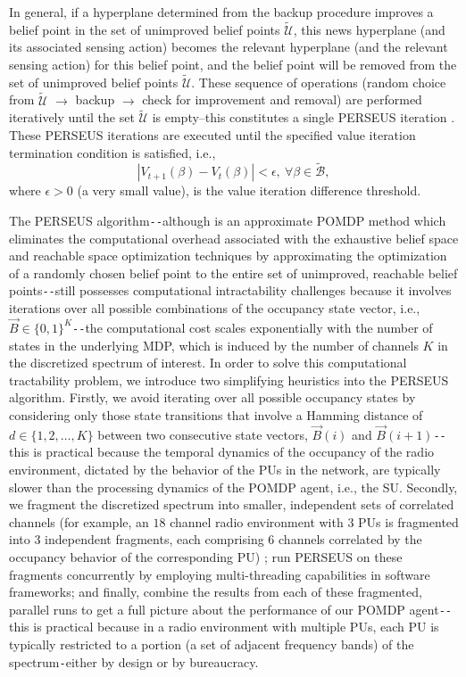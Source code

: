 \documentclass[12pt, draftcls, onecolumn]{IEEEtran}
\begin{document}
In general, if a hyperplane determined from the backup procedure improves a belief point in the set of unimproved belief points $\tilde{\mathcal{U}}$, this news hyperplane (and its associated sensing action) becomes the relevant hyperplane (and the relevant sensing action) for this belief point, and the belief point will be removed from the set of unimproved belief points $\tilde{\mathcal{U}}$. These sequence of operations (random choice from $\tilde{\mathcal{U}}$ ${\longrightarrow}$ backup ${\longrightarrow}$ check for improvement and removal) are performed iteratively until the set $\tilde{\mathcal{U}}$ is empty--this constitutes a single PERSEUS iteration \cite{WCL:paper}. These PERSEUS iterations are executed until the specified value iteration termination condition is satisfied, i.e.,
\begin{equation}\label{29}
    |V_{t+1}(\beta)-V_{t}(\beta)|<\epsilon,\ \forall \beta \in \tilde{\mathcal{B}},
\end{equation}
where $\epsilon{>}0$ (a very small value), is the value iteration difference threshold.

The PERSEUS algorithm\texttt{-{}-}although is an approximate POMDP method which eliminates the computational overhead associated with the exhaustive belief space and reachable space optimization techniques \cite{PUOccupancy:18,PUOccupancy:17} by approximating the optimization of a randomly chosen belief point to the entire set of unimproved, reachable belief points\texttt{-{}-}still possesses computational intractability challenges because it involves iterations over all possible combinations of the occupancy state vector, i.e., $\vec{B}{\in}\{0,1\}^{K}$\texttt{-{}-}the computational cost scales exponentially with the number of states in the underlying MDP, which is induced by the number of channels $K$ in the discretized spectrum of interest. In order to solve this computational tractability problem, we introduce two simplifying heuristics into the PERSEUS algorithm. Firstly, we avoid iterating over all possible occupancy states by considering only those state transitions that involve a Hamming distance of $d{\in}\{1,2,\dots,K\}$ between two consecutive state vectors, $\vec{B}(i)$ and $\vec{B}(i+1)$\texttt{-{}-}this is practical because the temporal dynamics of the occupancy of the radio environment, dictated by the behavior of the PUs in the network, are typically slower than the processing dynamics of the POMDP agent, i.e., the SU. Secondly, we fragment the discretized spectrum into smaller, independent sets of correlated channels (for example, an $18$ channel radio environment with $3$ PUs is fragmented into $3$ independent fragments, each comprising $6$ channels correlated by the occupancy behavior of the corresponding PU) \cite{WCL:paper}; run PERSEUS on these fragments concurrently by employing multi-threading capabilities in software frameworks; and finally, combine the results from each of these fragmented, parallel runs to get a full picture about the performance of our POMDP agent\texttt{-{}-}this is practical because in a radio environment with multiple PUs, each PU is typically restricted to a portion (a set of adjacent frequency bands) of the spectrum\texttt{-}either by design or by bureaucracy.
\end{document}
